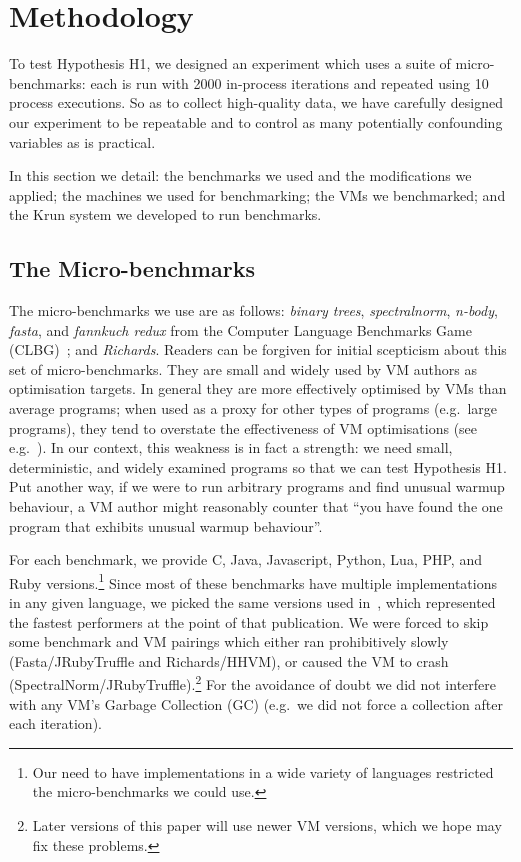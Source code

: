 \documentclass[preprint,numbers,10pt]{sigplanconf}
\newcommand{\krun}{Krun\xspace}
\newcommand{\hypone}{H1\xspace}
\newcommand{\binarytrees}{\emph{binary trees}\xspace}
\newcommand{\richards}{\emph{Richards}\xspace}
\newcommand{\spectralnorm}{\emph{spectralnorm}\xspace}
\newcommand{\nbody}{\emph{n-body}\xspace}
\newcommand{\fasta}{\emph{fasta}\xspace}
\newcommand{\fannkuch}{\emph{fannkuch redux}\xspace}
\begin{document}
\section{Methodology}
\label{sec:methodology}

To test Hypothesis H1, we designed an experiment which uses a suite of
micro-benchmarks: each is run with 2000 in-process iterations and repeated
using 10 process executions. So as
to collect high-quality data, we have carefully designed our
experiment to be repeatable and to control as many potentially confounding variables as
is practical.

In this section we detail: the benchmarks we used and the modifications we
applied; the machines we used for benchmarking; the VMs we benchmarked; and the
\krun system we developed to run benchmarks.


\subsection{The Micro-benchmarks}

The micro-benchmarks we use are as follows: \binarytrees, \spectralnorm, \nbody,
\fasta, and \fannkuch from the Computer Language Benchmarks Game (CLBG)~\cite{clbg}; and
\richards. Readers can be forgiven for initial scepticism about this set of micro-benchmarks.
They are small and widely
used by VM authors as optimisation targets. In general they are more effectively
optimised by VMs than average programs; when used as a proxy for other types
of programs (e.g.~large programs), they tend to overstate the effectiveness of
VM optimisations (see e.g.~\cite{ratanaworabhan09jsmeter}). In our context, this weakness is in fact a strength: we need
small, deterministic, and widely examined programs so that we can test
Hypothesis \hypone. Put another way, if we were to run arbitrary programs
and find unusual warmup behaviour, a VM author might reasonably counter that
``you have found the one program that exhibits unusual warmup behaviour''.

For each benchmark, we provide C, Java, Javascript, Python, Lua, PHP,
and Ruby versions.\footnote{Our need to have implementations in a wide variety
of languages restricted the micro-benchmarks we could use.} Since most of these
benchmarks have multiple implementations in any given language, we picked
the same versions used in~\cite{bolz14impact}, which represented the fastest
performers at the point of that publication. We were forced to skip some
benchmark and VM pairings which either ran prohibitively slowly
(Fasta/JRubyTruffle and Richards/HHVM), or caused the VM to crash
(SpectralNorm/JRubyTruffle).\footnote{Later versions of this paper
will use newer VM versions, which we hope may fix these problems.}
For the avoidance of doubt we
did not interfere with any VM's Garbage Collection (GC) (e.g.~we did not
force a collection after each iteration).
\end{document}
